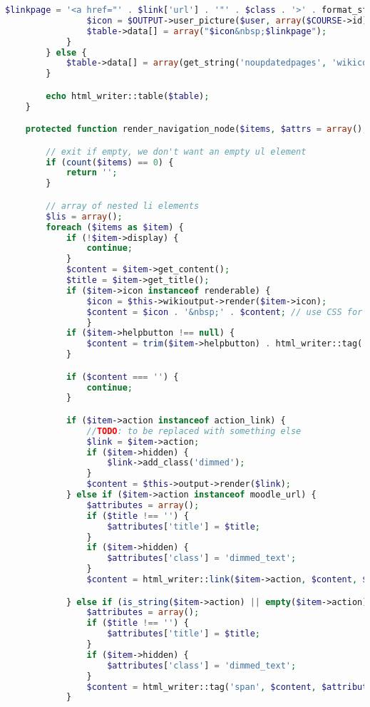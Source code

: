 \begin{lstlisting}[language=PHP]
                $linkpage = '<a href="' . $link['url'] . '"' . $class . '>' . format_string($link['content']) . '</a>';
                $icon = $OUTPUT->user_picture($user, array($COURSE->id));
                $table->data[] = array("$icon&nbsp;$linkpage");
            }
        } else {
            $table->data[] = array(get_string('noupdatedpages', 'wikicode'));
        }

        echo html_writer::table($table);
    }

    protected function render_navigation_node($items, $attrs = array(), $expansionlimit = null, $depth = 1) {

        // exit if empty, we don't want an empty ul element
        if (count($items) == 0) {
            return '';
        }

        // array of nested li elements
        $lis = array();
        foreach ($items as $item) {
            if (!$item->display) {
                continue;
            }
            $content = $item->get_content();
            $title = $item->get_title();
            if ($item->icon instanceof renderable) {
                $icon = $this->wikioutput->render($item->icon);
                $content = $icon . '&nbsp;' . $content; // use CSS for spacing of icons
                }
            if ($item->helpbutton !== null) {
                $content = trim($item->helpbutton) . html_writer::tag('span', $content, array('class' => 'clearhelpbutton'));
            }

            if ($content === '') {
                continue;
            }

            if ($item->action instanceof action_link) {
                //TODO: to be replaced with something else
                $link = $item->action;
                if ($item->hidden) {
                    $link->add_class('dimmed');
                }
                $content = $this->output->render($link);
            } else if ($item->action instanceof moodle_url) {
                $attributes = array();
                if ($title !== '') {
                    $attributes['title'] = $title;
                }
                if ($item->hidden) {
                    $attributes['class'] = 'dimmed_text';
                }
                $content = html_writer::link($item->action, $content, $attributes);

            } else if (is_string($item->action) || empty($item->action)) {
                $attributes = array();
                if ($title !== '') {
                    $attributes['title'] = $title;
                }
                if ($item->hidden) {
                    $attributes['class'] = 'dimmed_text';
                }
                $content = html_writer::tag('span', $content, $attributes);
            }


\end{lstlisting}
